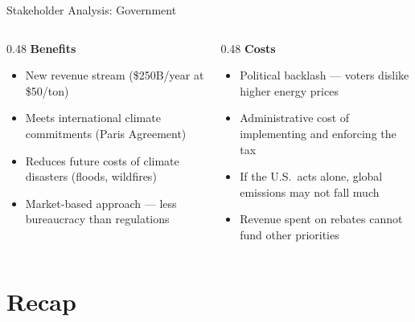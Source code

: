 \documentclass[9pt,english,aspectratio=169]{beamer}
\begin{document}
\begin{frame}{Stakeholder Analysis: Government}

  \begin{columns}[T]
    \begin{column}{0.48\textwidth}
      \textbf{\textcolor{green!60!black}{Benefits}}
      \begin{itemize}\small
        \item New revenue stream (\$250B/year at \$50/ton)
        \item Meets international climate commitments (Paris Agreement)
        \item Reduces future costs of climate disasters (floods, wildfires)
        \item Market-based approach --- less bureaucracy than regulations
      \end{itemize}
    \end{column}
    \begin{column}{0.48\textwidth}
      \textbf{\textcolor{vermillion}{Costs}}
      \begin{itemize}\small
        \item Political backlash --- voters dislike higher energy prices
        \item Administrative cost of implementing and enforcing the tax
        \item If the U.S.\ acts alone, global emissions may not fall much
        \item Revenue spent on rebates cannot fund other priorities
      \end{itemize}
    \end{column}
  \end{columns}

\end{frame}

\section{Recap}
\end{document}
